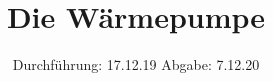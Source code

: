 

\subject{V206}
\title{Die Wärmepumpe}
\date{%
  Durchführung: 17.12.19
  \hspace{3em}
  Abgabe: 7.12.20
}



\maketitle
\thispagestyle{empty}
\tableofcontents
\newpage







\printbibliography{}


